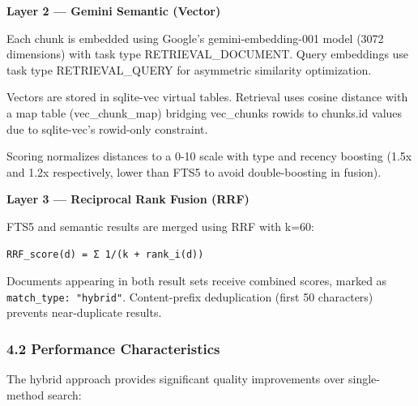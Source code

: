 \documentclass[
]{article}
\begin{document}
\textbf{Layer 2 --- Gemini Semantic (Vector)}

Each chunk is embedded using Google's gemini-embedding-001 model (3072
dimensions) with task type RETRIEVAL\_DOCUMENT. Query embeddings use
task type RETRIEVAL\_QUERY for asymmetric similarity optimization.

Vectors are stored in sqlite-vec virtual tables. Retrieval uses cosine
distance with a map table (vec\_chunk\_map) bridging vec\_chunks rowids
to chunks.id values due to sqlite-vec's rowid-only constraint.

Scoring normalizes distances to a 0-10 scale with type and recency
boosting (1.5x and 1.2x respectively, lower than FTS5 to avoid
double-boosting in fusion).

\textbf{Layer 3 --- Reciprocal Rank Fusion (RRF)}

FTS5 and semantic results are merged using RRF with k=60:

\begin{verbatim}
RRF_score(d) = Σ 1/(k + rank_i(d))
\end{verbatim}

Documents appearing in both result sets receive combined scores, marked
as \texttt{match\_type:\ "hybrid"}. Content-prefix deduplication (first
50 characters) prevents near-duplicate results.

\subsubsection{4.2 Performance
Characteristics}\label{performance-characteristics}

The hybrid approach provides significant quality improvements over
single-method search:
\end{document}
